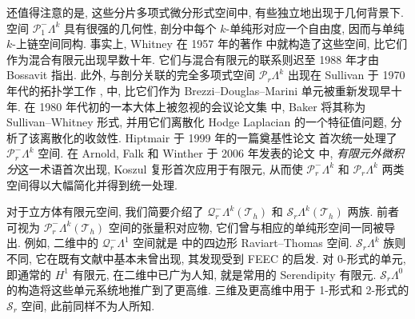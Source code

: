 {还值得注意的是, 这些分片多项式微分形式空间中, 有些独立地出现于几何背景下. 空间 $\mathcal P_1^-\Lambda^k$ 具有很强的几何性, 剖分中每个 $k$-单纯形对应一个自由度, 因而与单纯 $k$-上链空间同构. 事实上, Whitney 在 1957 年的著作  中就构造了这些空间, 比它们作为混合有限元出现早数十年. 它们与混合有限元的联系则迟至 1988 年才由 Bossavit  指出. 此外, 与剖分关联的完全多项式空间 $\mathcal P_r\Lambda^k$ 出现在 Sullivan 于 1970 年代的拓扑学工作 ,  中, 比它们作为 Brezzi–Douglas–Marini 单元被重新发现早十年. 在 1980 年代初的一本大体上被忽视的会议论文集  中, Baker 将其称为 Sullivan–Whitney 形式, 并用它们离散化 Hodge Laplacian 的一个特征值问题, 分析了该离散化的收敛性. Hiptmair 于 1999 年的一篇奠基性论文  首次统一处理了 $\mathcal P_r^-\Lambda^k$ 空间. 在 Arnold, Falk 和 Winther 于 2006 年发表的论文  中, \emph{有限元外微积分}这一术语首次出现, Koszul 复形首次应用于有限元, 从而使 $\mathcal P_r^-\Lambda^k$ 和 $\mathcal P_r\Lambda^k$ 两类空间得以大幅简化并得到统一处理.}

{对于立方体有限元空间, 我们简要介绍了 $\mathcal Q_r^-\Lambda^k(\mathcal T_h)$ 和 $\mathcal S_r\Lambda^k(\mathcal T_h)$ 两族. 前者可视为 $\mathcal P_r^-\Lambda^k(\mathcal T_h)$ 空间的张量积对应物, 它们曾与相应的单纯形空间一同被导出. 例如, 二维中的 $\mathcal Q_r^-\Lambda^1$ 空间就是  中的四边形 Raviart–Thomas 空间. $\mathcal S_r\Lambda^k$ 族则不同, 它在既有文献中基本未曾出现, 其发现受到 FEEC 的启发. 对 0-形式的单元, 即通常的 $H^1$ 有限元, 在二维中已广为人知, 就是常用的 Serendipity 有限元. $\mathcal S_r\Lambda^0$ 的构造将这些单元系统地推广到了更高维. 三维及更高维中用于 1-形式和 2-形式的 $\mathcal S_r$ 空间, 此前同样不为人所知.}


